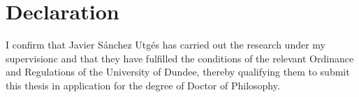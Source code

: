 \chapter*{Declaration} %

I confirm that Javier Sánchez Utgés has carried out the research under my supervisionc and that they have fulfilled the conditions of the relevant Ordinance and Regulations of the University of Dundee, thereby qualifying them to submit this thesis in application for the degree of Doctor of Philosophy.